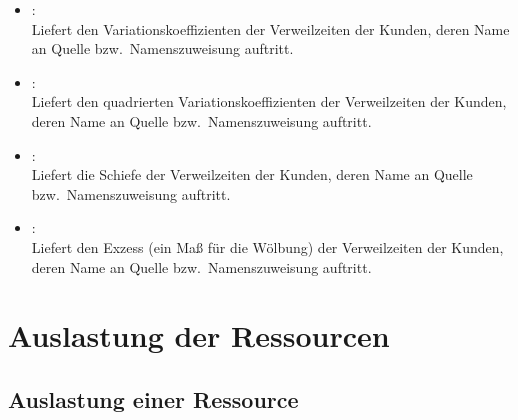 \begin{itemize}
\item
{}:\\
Liefert den Variationskoeffizienten der Verweilzeiten der Kunden, deren Name an Quelle bzw.\ Namenszuweisung  auftritt.

\item
{}:\\
Liefert den quadrierten Variationskoeffizienten der Verweilzeiten der Kunden, deren Name an Quelle bzw.\ Namenszuweisung  auftritt.

\item
{}:\\
Liefert die Schiefe der Verweilzeiten der Kunden, deren Name an Quelle bzw.\ Namenszuweisung  auftritt.

\item
{}:\\
Liefert den Exzess (ein Maß für die Wölbung) der Verweilzeiten der Kunden, deren Name an Quelle bzw.\ Namenszuweisung  auftritt.

\end{itemize}  



\section{Auslastung der Ressourcen}



\subsection{Auslastung einer Ressource}

